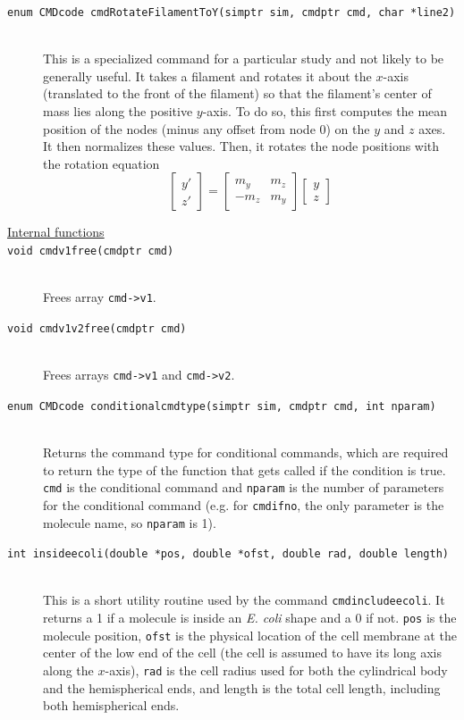 \documentclass {scrbook}
\newcommand {\ttt} {\texttt}
\begin{document}
\begin{description}
\item[\ttt{enum CMDcode cmdRotateFilamentToY(simptr sim, cmdptr cmd, char *line2)}]
\hfill \\
This is a specialized command for a particular study and not likely to be generally useful. It takes a filament and rotates it about the $x$-axis (translated to the front of the filament) so that the filament's center of mass lies along the positive $y$-axis. To do so, this first computes the mean position of the nodes (minus any offset from node 0) on the $y$ and $z$ axes. It then normalizes these values. Then, it rotates the node positions with the rotation equation
$$\left[ \begin{array}{c} y' \\ z' \end{array} \right] = \left[ \begin{array}{cc} m_y & m_z \\ -m_z & m_y \end{array} \right] \left[ \begin{array}{c} y \\ z \end{array} \right]$$


\item[\underline{Internal functions}]

\item[\ttt{void cmdv1free(cmdptr cmd)}]
\hfill \\
Frees array \ttt{cmd->v1}.

\item[\ttt{void cmdv1v2free(cmdptr cmd)}]
\hfill \\
Frees arrays \ttt{cmd->v1} and \ttt{cmd->v2}.

\item[\ttt{enum CMDcode conditionalcmdtype(simptr sim, cmdptr cmd, int nparam)}]
\hfill \\
Returns the command type for conditional commands, which are required to return the type of the function that gets called if the condition is true. \ttt{cmd} is the conditional command and \ttt{nparam} is the number of parameters for the conditional command (e.g. for \ttt{cmdifno}, the only parameter is the molecule name, so \ttt{nparam} is 1).

\item[\ttt{int insideecoli(double *pos, double *ofst, double rad, double length)}]
\hfill \\
This is a short utility routine used by the command \ttt{cmdincludeecoli}. It returns a 1 if a molecule is inside an \emph{E. coli} shape and a 0 if not. \ttt{pos} is the molecule position, \ttt{ofst} is the physical location of the cell membrane at the center of the low end of the cell (the cell is assumed to have its long axis along the $x$-axis), \ttt{rad} is the cell radius used for both the cylindrical body and the hemispherical ends, and length is the total cell length, including both hemispherical ends.


\end{description}
\end{document}
